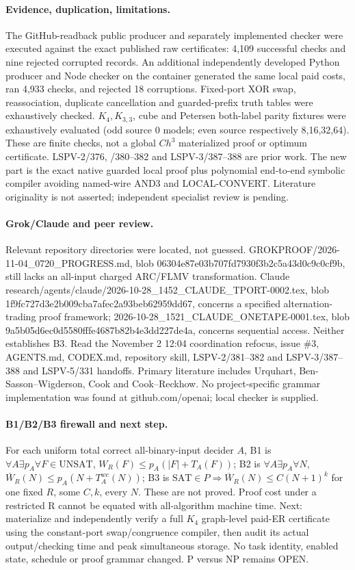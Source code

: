 \documentclass[11pt]{article}
\begin{document}
\paragraph{Evidence, duplication, limitations.}
The GitHub-readback public producer and separately implemented checker were executed against the exact published raw certificates: 4,109 successful checks and nine rejected corrupted records. An additional independently developed Python producer and Node checker on the container generated the same local paid costs, ran 4,933 checks, and rejected 18 corruptions. Fixed-port XOR swap, reassociation, duplicate cancellation and guarded-prefix truth tables were exhaustively checked. $K_4,K_{3,3}$, cube and Petersen both-label parity fixtures were exhaustively evaluated (odd source 0 models; even source respectively 8,16,32,64). These are finite checks, not a global $Ch^3$ materialized proof or optimum certificate. LSPV-2/376, /380--382 and LSPV-3/387--388 are prior work. The new part is the exact native guarded local proof plus polynomial end-to-end symbolic compiler avoiding named-wire AND3 and LOCAL-CONVERT. Literature originality is not asserted; independent specialist review is pending.

\paragraph{Grok/Claude and peer review.}
Relevant repository directories were located, not guessed. GROKPROOF/2026-11-04\_0720\_PROGRESS.md, blob 06304e87e03b707fd7930f3b2c5a43d0c9c0cf9b, still lacks an all-input charged ARC/FLMV transformation. Claude research/agents/claude/2026-10-28\_1452\_CLAUDE\_TPORT-0002.tex, blob 1f9fc727d3e2b009cba7afec2a93beb62959dd67, concerns a specified alternation-trading proof framework; 2026-10-28\_1521\_CLAUDE\_ONETAPE-0001.tex, blob 9a5b05d6ec0d5580fffe4687b82b4e3dd227de4a, concerns sequential access. Neither establishes B3. Read the November 2 12:04 coordination refocus, issue \#3, AGENTS.md, CODEX.md, repository skill, LSPV-2/381--382 and LSPV-3/387--388 and LSPV-5/331 handoffs. Primary literature includes Urquhart, Ben-Sasson--Wigderson, Cook and Cook--Reckhow. No project-specific grammar implementation was found at github.com/openai; local checker is supplied.

\paragraph{B1/B2/B3 firewall and next step.}
For each uniform total correct all-binary-input decider $A$, B1 is $\forall A\exists p_A\forall F\in\mathrm{UNSAT}$, $W_R(F)\le p_A(|F|+T_A(F))$; B2 is $\forall A\exists p_A\forall N$, $\overline W_R(N)\le p_A(N+T_A^{wc}(N))$; B3 is $\mathrm{SAT}\in P\Rightarrow\overline W_R(N)\le C(N+1)^k$ for one fixed $R$, some $C,k$, every $N$. These are not proved. Proof cost under a restricted R cannot be equated with all-algorithm machine time. Next: materialize and independently verify a full $K_4$ graph-level paid-ER certificate using the constant-port swap/congruence compiler, then audit its actual output/checking time and peak simultaneous storage. No task identity, enabled state, schedule or proof grammar changed. P versus NP remains OPEN.
\end{document}
